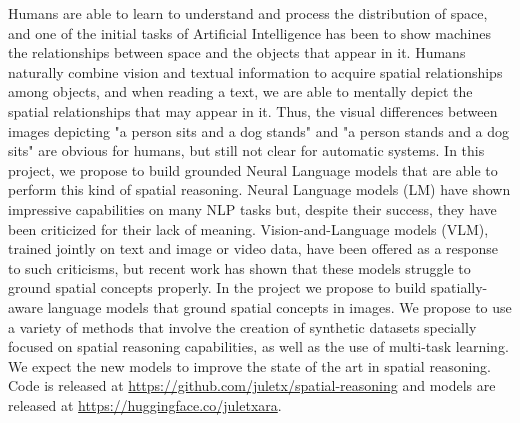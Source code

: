 Humans are able to learn to understand and process the distribution of space, and one of the initial tasks of Artificial Intelligence has been to show machines the relationships between space and the objects that appear in it. Humans naturally combine vision and textual information to acquire spatial relationships among objects, and when reading a text, we are able to mentally depict the spatial relationships that may appear in it. Thus, the visual differences between images depicting "a person sits and a dog stands" and "a person stands and a dog sits" are obvious for humans, but still not clear for automatic systems. In this project, we propose to build grounded Neural Language models that are able to perform this kind of spatial reasoning. Neural Language models (LM) have shown impressive capabilities on many NLP tasks but, despite their success, they have been criticized for their lack of meaning. Vision-and-Language models (VLM), trained jointly on text and image or video data, have been offered as a response to such criticisms, but recent work has shown that these models struggle to ground spatial concepts properly. In the project we propose to build spatially-aware language models that ground spatial concepts in images. We propose to use a variety of methods that involve the creation of synthetic datasets specially focused on spatial reasoning capabilities, as well as the use of multi-task learning. We expect the new models to improve the state of the art in spatial reasoning. Code is released at \url{https://github.com/juletx/spatial-reasoning} and models are released at \url{https://huggingface.co/juletxara}.